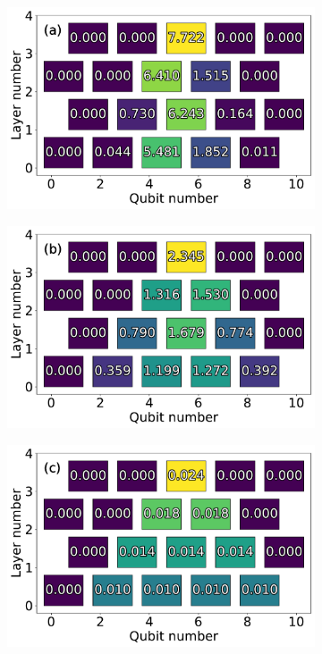 \begin{figure}
    \centering
    \begin{subfigure}{.48\linewidth}
        \centering
        \includegraphics[width=\textwidth]{figures/X5_ising.pdf}
    \end{subfigure}\begin{subfigure}{.48\linewidth}
        \centering
        \includegraphics[width=\textwidth]{figures/X5_cartan.pdf}
    \end{subfigure}
    \begin{subfigure}{.48\linewidth}
        \centering
        \includegraphics[width=\textwidth]{figures/X5_theory.pdf}

\end{subfigure}
\end{figure}
